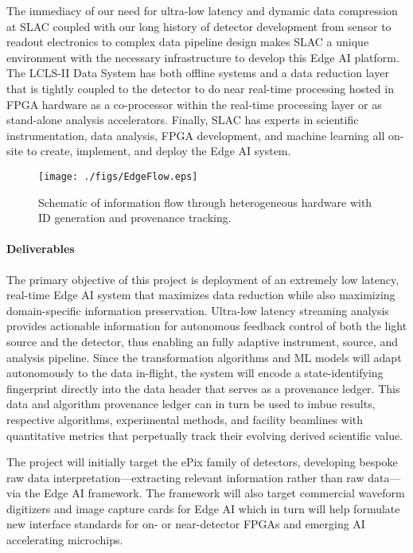 \documentclass{article}
\begin{document}
The immediacy of our need for ultra-low latency and dynamic data compression at SLAC coupled with our long history of detector development from sensor to readout electronics to complex data pipeline design makes SLAC a unique environment with the necessary infrastructure to develop this Edge AI platform.
The LCLS-II Data System has both offline systems and a data reduction layer that is tightly coupled to the detector to do near real-time processing hosted in FPGA hardware as a co-processor within the real-time processing layer or as stand-alone analysis accelerators. 
Finally, SLAC has experts in scientific instrumentation, data analysis, FPGA development, and machine learning all on-site to create, implement, and deploy the Edge AI system.

\begin{figure}
	\vspace{-1\baselineskip}
	\centerline{\texttt{[image: ./figs/EdgeFlow.eps]}}
	\vspace{-1\baselineskip}
	\caption{
		\label{fig::EdgeFlow}
		Schematic of information flow through heterogeneous hardware with ID generation and provenance tracking.
		}
	\vspace{-1\baselineskip}
\end{figure}

\paragraph{Deliverables}%
The primary objective of this project is deployment of an extremely low latency, real-time Edge AI system that maximizes data reduction while also maximizing domain-specific information preservation. 
Ultra-low latency streaming analysis provides actionable information for autonomous feedback control of both the light source and the detector, thus enabling an fully adaptive instrument, source, and analysis pipeline.
Since the transformation algorithms and ML models will adapt autonomously to the data in-flight, the system will encode a state-identifying fingerprint directly into the data header that serves as a provenance ledger.
This data and algorithm provenance ledger can in turn be used to imbue results, respective algorithms, experimental methods, and facility beamlines with quantitative metrics that perpetually track their evolving derived scientific value.

The project will initially target the ePix family of detectors, developing bespoke raw data interpretation---extracting relevant information rather than raw data---via the Edge AI framework. 
The framework will also target commercial waveform digitizers and image capture cards for Edge AI which in turn will help formulate new interface standards for on- or near-detector FPGAs and emerging AI accelerating microchips.


\end{document}
